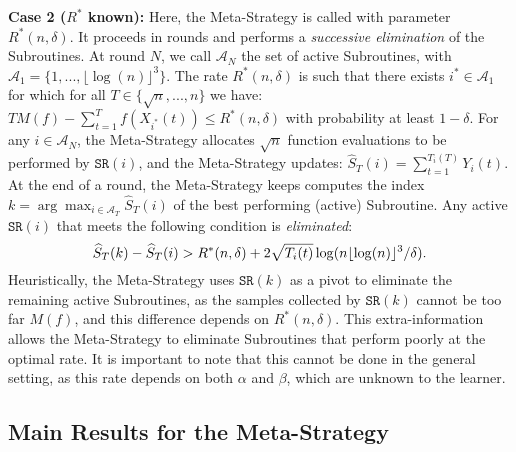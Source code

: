 \documentclass[final,12pt]{colt2018}
\newcommand{\floor}[1]{\lfloor #1 \rfloor}
\begin{document}
\noindent\textbf{Case 2 ($R^*$ known):} Here, the Meta-Strategy is called with parameter $R^*(n,\delta)$. It proceeds in rounds and performs a \emph{successive elimination} of the Subroutines. At round $N$, we call $\mathcal A_N$ the set of active Subroutines, with $\mathcal A_1 = \{1, ..., \floor{\log(n)}^3\}$. The rate $R^*(n,\delta)$ is such that there exists $i^* \in \mathcal A_1$ for which for all $T \in \{\sqrt{n}, ..., n\}$ we have: $TM(f) - \sum_{t=1}^T f(X_{i^*}(t)) \leq R^*(n,\delta)$ with probability at least $1-\delta$. For any $i \in \mathcal A_N$, the Meta-Strategy allocates $\sqrt{n}$ function evaluations to be performed by $\texttt{SR}(i)$, and the Meta-Strategy updates: $\widehat{S}_T(i) = \sum_{t=1}^{T_i(T)} Y_i(t)$. At the end of a round, the Meta-Strategy keeps computes the index $k = \arg\max_{i \in \mathcal A_T} \widehat{S}_T(i)$ of the best performing (active) Subroutine. Any active $\texttt{SR}(i)$ that meets the following condition is \emph{eliminated}:
$$
\widehat{S}_T(k) - \widehat{S}_T(i) > R^*(n,\delta) + 2\sqrt{T_i(t)}\log(n\floor{\log(n)}^3/\delta).
\vspace{-0.1cm}
$$
Heuristically, the Meta-Strategy uses $\texttt{SR}(k)$ as a pivot to eliminate the remaining active Subroutines, as the samples collected by $\texttt{SR}(k)$ cannot be too far $M(f)$, and this difference depends on $R^*(n,\delta)$. This extra-information allows the Meta-Strategy to eliminate Subroutines that perform poorly at the optimal rate. It is important to note that this cannot be done in the general setting, as this rate depends on both $\alpha$ and $\beta$, which are unknown to the learner.

\subsection{Main Results for the Meta-Strategy}
\end{document}
